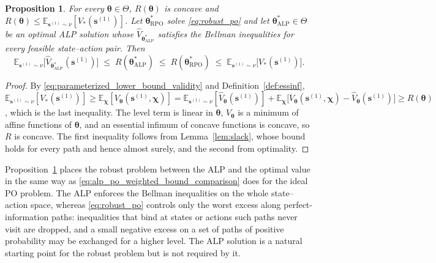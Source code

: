 \documentclass[11pt]{article}
\newtheorem{proposition}{Proposition}
\theoremstyle{definition}
\begin{document}
\begin{proposition}
\label{prop:robust_po}
For every \(\boldsymbol{\theta}\in\Theta\), \(R(\boldsymbol{\theta})\) is concave and \(R(\boldsymbol{\theta})\le\mathbb E_{\boldsymbol s^{(1)}\sim\nu}[V_*(\boldsymbol s^{(1)})]\). Let \(\boldsymbol\theta_{\mathrm{RPO}}^*\) solve \eqref{eq:robust_po} and let \(\boldsymbol\theta_{\mathrm{ALP}}^*\in\Theta\) be an optimal ALP solution whose \(\hat V_{\boldsymbol\theta_{\mathrm{ALP}}^*}\) satisfies the Bellman inequalities for every feasible state--action pair. Then
\begin{equation}
\label{eq:alp_rpo_comparison}
\mathbb E_{\boldsymbol s^{(1)}\sim\nu}\bigl[\hat V_{\boldsymbol\theta_{\mathrm{ALP}}^*}(\boldsymbol s^{(1)})\bigr]
\;\le\; R(\boldsymbol\theta_{\mathrm{ALP}}^*)
\;\le\; R(\boldsymbol\theta_{\mathrm{RPO}}^*)
\;\le\; \mathbb E_{\boldsymbol s^{(1)}\sim\nu}\bigl[V_*(\boldsymbol s^{(1)})\bigr].
\end{equation}
\end{proposition}
\begin{proof}
By \eqref{eq:parameterized_lower_bound_validity} and Definition~\ref{def:essinf},
\(\mathbb E_{\boldsymbol s^{(1)}\sim\nu}[V_*(\boldsymbol s^{(1)})]\ge\mathbb E_{\boldsymbol\chi}[V_{\boldsymbol{\theta}}(\boldsymbol s^{(1)},\boldsymbol\chi)]
=\mathbb E_{\boldsymbol s^{(1)}\sim\nu}[\hat V_{\boldsymbol{\theta}}(\boldsymbol s^{(1)})]+\mathbb E_{\boldsymbol\chi}\bigl[V_{\boldsymbol{\theta}}(\boldsymbol s^{(1)},\boldsymbol\chi)-\hat V_{\boldsymbol{\theta}}(\boldsymbol s^{(1)})\bigr]
\ge R(\boldsymbol{\theta})\), which is the last inequality. The level term is linear in \(\boldsymbol{\theta}\), \(V_{\boldsymbol{\theta}}\) is a minimum of affine functions of \(\boldsymbol{\theta}\), and an essential infimum of concave functions is concave, so \(R\) is concave. The first inequality follows from Lemma~\ref{lem:slack}, whose bound holds for every path and hence almost surely, and the second from optimality.
\end{proof}

Proposition~\ref{prop:robust_po} places the robust problem between the ALP and the optimal value in the same way as \eqref{eq:alp_po_weighted_bound_comparison} does for the ideal PO problem. The ALP enforces the Bellman inequalities on the whole state--action space, whereas \eqref{eq:robust_po} controls only the worst excess along perfect-information paths: inequalities that bind at states or actions such paths never visit are dropped, and a small negative excess on a set of paths of positive probability may be exchanged for a higher level. The ALP solution is a natural starting point for the robust problem but is not required by it.
\end{document}
